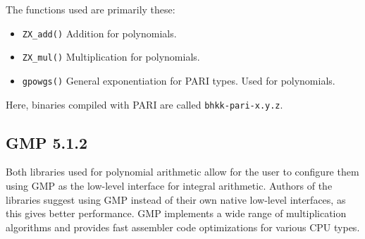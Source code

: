 \documentclass[a4paper]{article}
\newcommand{\code}{\texttt}
\begin{document}
The functions used are primarily these: 

\begin{itemize}
\item \code{ZX\_add()}
\subitem Addition for polynomials. %
\item \code{ZX\_mul()}
\subitem Multiplication for polynomials. %
\item \code{gpowgs()}
\subitem General exponentiation for PARI types. Used for polynomials.
\end{itemize}

Here, binaries compiled with PARI are called \code{bhkk-pari-x.y.z}.



\subsection{GMP 5.1.2}
Both libraries used for polynomial arithmetic allow for the user to configure them using GMP \cite{gmp} as the low-level interface for integral arithmetic. Authors of the libraries suggest using GMP instead of their own native low-level interfaces, as this gives better performance. GMP implements a wide range of multiplication algorithms and provides fast assembler code optimizations for various CPU types.

% 
\end{document}
